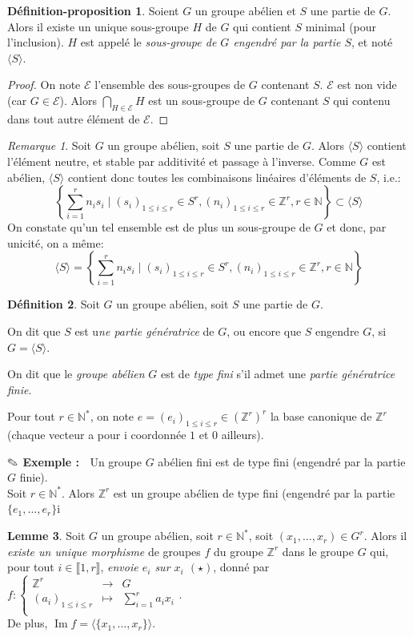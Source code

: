 \documentclass{article}
\newcommand{\Z}{\mathbb{Z}}
\newcommand{\N}{\mathbb{N}}
\newcommand{\im}{\mathop{\mathrm{Im}}\nolimits}
\newcommand{\dis}{\displaystyle}
\newcommand{\nt}[1]{\llbracket  #1 \rrbracket }
\theoremstyle{definition}
\newtheorem{defi}{Définition}[section]
\newtheorem{depro}[defi]{Définition-proposition}
\newtheorem{lem}[defi]{Lemme}
\theoremstyle{remark}
\newtheorem{rem}{Remarque}
\newcommand{\exem}{{\textbf{$\text{\ding{46}}$ Exemple : \ }}}
\newcommand{\app}[5]{#1:\left\{\begin{array}{rcl}
#2 & \longrightarrow & #3 \\
#4 & \longmapsto & #5  \\
\end{array}\right.
}
\begin{document}
\begin{depro}
Soient $G$ un groupe abélien et $S$ une partie de $G$. Alors il existe un unique sous-groupe $H$ de $G$ qui contient $S$ minimal (pour l'inclusion). $H$ est appelé le \textit{sous-groupe de $G$ engendré par la partie $S$}, et noté $\langle S\rangle$.
\end{depro}

\begin{proof}
On note $\mathcal{E}$ l'ensemble des sous-groupes de $G$ contenant $S$. $\mathcal{E}$ est non vide (car $G \in\mathcal{E}$). Alors $\dis \bigcap_{H \in \mathcal{E}} H$ est un sous-groupe de $G$ contenant $S$ qui contenu dans tout autre élément de $\mathcal{E}$.
\end{proof}

\begin{rem}
Soit $G$ un groupe abélien, soit $S$ une partie de $G$. Alors $\langle S\rangle$ contient l'élément neutre, et stable par additivité et passage à l'inverse. Comme $G$ est abélien, $\langle S\rangle$ contient donc toutes les combinaisons linéaires d'éléments de $S$, i.e.:
$$\left\{\dis \sum_{i=1}^r n_is_i \mid (s_i)_{1 \leqslant i \leqslant r} \in S^r, (n_i)_{1 \leqslant i \leqslant r} \in \Z^r, r \in \N \right\}\subset\langle S\rangle$$
On constate qu'un tel ensemble est de plus un sous-groupe de $G$ et donc, par unicité, on a m\^eme:
$$\langle S\rangle=\left\{\dis \sum_{i=1}^r n_is_i \mid (s_i)_{1 \leqslant i \leqslant r} \in S^r, (n_i)_{1 \leqslant i \leqslant r} \in \Z^r, r \in \N \right\}$$
\end{rem}

\begin{defi}
Soit $G$ un groupe abélien, soit $S$ une partie de $G$. 
\begin{point}
\item On dit que $S$ est u\textit{ne partie génératrice} de $G$, ou encore que $S$ engendre $G$, si $G=\langle S\rangle$.
\item On dit que le \textit{groupe abélien} $G$ est de \textit{type fini} s'il admet une \textit{partie génératrice finie}. 
\end{point}
\end{defi}

Pour tout $r \in \N^*$, on note $e=(e_i)_{1 \leqslant i \leqslant r} \in \left(\Z^r\right)^r$ la base canonique de $\Z^r$ (chaque vecteur a pour i coordonnée $1$ et $0$ ailleurs).

\exem Un groupe $G$ abélien fini est de type fini (engendré par la partie $G$ finie). \\
Soit $r \in \N^*$. Alors $\Z^r$ est un groupe abélien de type fini (engendré par la partie $\{e_1, \ldots, e_r \}$i
\begin{lem}\label{morphisme-Zr-G}
Soit $G$ un groupe abélien, soit $r \in \N^*$, soit $(x_1, \ldots, x_r) \in G^r$. Alors il \textit{existe un unique morphisme} de groupes $f$ du groupe $\Z^r$ dans le groupe $G$ qui, pour tout $i \in \nt{1,r}$, \textit{envoie $e_i$ sur $x_i$ $(\star)$}, donné par $\app{f}{\Z^r}{G}{(a_i)_{1 \leqslant i \leqslant r}}{\dis \sum_{i=1}^ra_ix_i}$. \\ De plus, $\im f =\langle\{x_1, \ldots, x_r\}\rangle$.
\end{lem}
\end{document}
